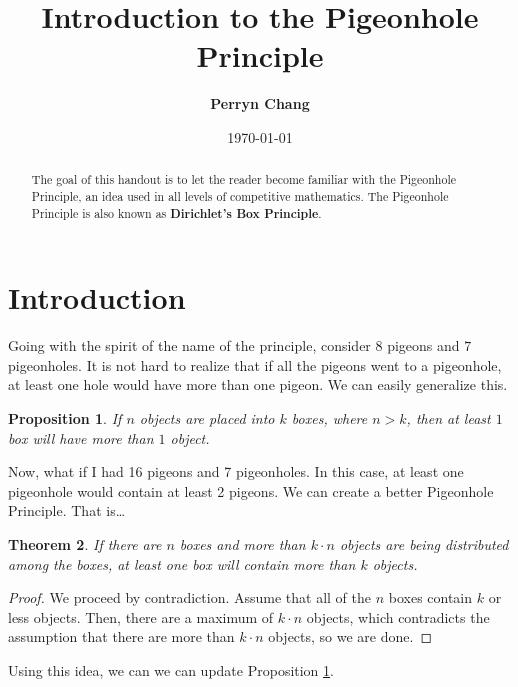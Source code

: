 \documentclass[l1pt]{article}
\title{\textbf{Introduction to the Pigeonhole Principle}}
\author{\textbf{Perryn Chang}}
\date{\today}
\theoremstyle{plain}
\newtheorem{thm}{Theorem}[section]
\newtheorem{prop}[thm]{Proposition}
\theoremstyle{definition}
\theoremstyle{remark}
\begin{document}
\maketitle

\begin{abstract}
The goal of this handout is to let the reader become familiar with the Pigeonhole Principle, an idea used in all levels of competitive mathematics. The Pigeonhole Principle is also known as \textbf{Dirichlet's Box Principle}.
\end{abstract}

\tableofcontents

\eject

\section{Introduction}
Going with the spirit of the name of the principle, consider $8$ pigeons and $7$ pigeonholes. It is not hard to realize that if all the pigeons went to a pigeonhole, at least one hole would have more than one pigeon. We can easily generalize this.

\begin{mdframed}
    \begin{prop}
    \label{prop:beginintro}
    If $n$ objects are placed into $k$ boxes, where $n>k$, then at least $1$ box will have more than $1$ object.
    \end{prop}
\end{mdframed}

Now, what if I had 16 pigeons and 7 pigeonholes. In this case, at least one pigeonhole would contain at least 2 pigeons. We can create a better Pigeonhole Principle. That is\dots 


\begin{mdframed}
\begin{thm}
If there are $n$ boxes and more than $k\cdot n$ objects are being distributed among the boxes, at least one box will contain more than $k$ objects.
\end{thm}
\end{mdframed}

\begin{proof}
We proceed by contradiction. Assume that all of the $n$ boxes contain $k$ or less objects. Then, there are a maximum of $k\cdot n$ objects, which contradicts the assumption that there are more than $k\cdot n$ objects, so we are done.
\end{proof}


Using this idea, we can we can update Proposition \ref{prop:beginintro}.
\end{document}
